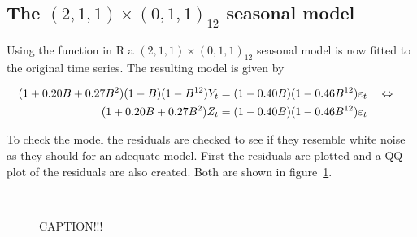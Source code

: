\subsection*{The $(2,1,1)\times(0,1,1)_{12}$ seasonal model}

Using the  function in R a $(2,1,1)\times(0,1,1)_{12}$ seasonal model is now fitted to the original time series. The resulting model is given by \par

\begin{align*}
    (1 + 0.20B + 0.27B^2)(1-B)(1-B^{12})Y_t &= (1-0.40B)(1-0.46B^{12})\varepsilon_t \quad\Leftrightarrow\quad\\
    (1 + 0.20B + 0.27B^2)Z_t &= (1-0.40B)(1-0.46B^{12})\varepsilon_t
\end{align*}

To check the model the residuals are checked to see if they resemble white noise as they should for an adequate model. First the residuals are plotted and a QQ-plot of the residuals are also created. Both are shown in figure~\ref{fig:qq-residuals-m1}. \par

\begin{figure}[htb]
    \centering
    \mbox{
         \quad 
    }
    \caption{CAPTION!!!}
    \label{fig:qq-residuals-m1}
\end{figure}

